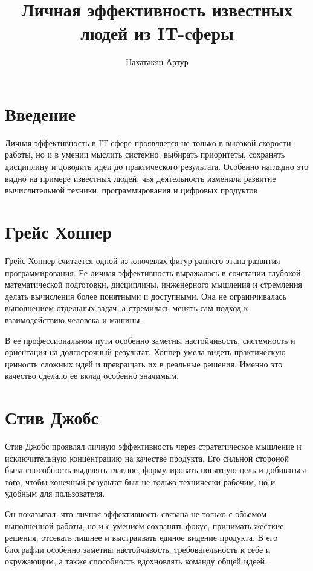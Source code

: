 \documentclass[12pt,a4paper]{article}
\title{Личная эффективность известных людей из IT-сферы}
\author{Нахатакян Артур}
\date{}
\begin{document}
\maketitle

\section*{Введение}

Личная эффективность в IT-сфере проявляется не только в высокой скорости работы, но и в умении мыслить системно, выбирать приоритеты, сохранять дисциплину и доводить идеи до практического результата. Особенно наглядно это видно на примере известных людей, чья деятельность изменила развитие вычислительной техники, программирования и цифровых продуктов.

\section*{Грейс Хоппер}

Грейс Хоппер считается одной из ключевых фигур раннего этапа развития программирования. Ее личная эффективность выражалась в сочетании глубокой математической подготовки, дисциплины, инженерного мышления и стремления делать вычисления более понятными и доступными. Она не ограничивалась выполнением отдельных задач, а стремилась менять сам подход к взаимодействию человека и машины.

В ее профессиональном пути особенно заметны настойчивость, системность и ориентация на долгосрочный результат. Хоппер умела видеть практическую ценность сложных идей и превращать их в реальные решения. Именно это качество сделало ее вклад особенно значимым.

\section*{Стив Джобс}

Стив Джобс проявлял личную эффективность через стратегическое мышление и исключительную концентрацию на качестве продукта. Его сильной стороной была способность выделять главное, формулировать понятную цель и добиваться того, чтобы конечный результат был не только технически рабочим, но и удобным для пользователя.

Он показывал, что личная эффективность связана не только с объемом выполненной работы, но и с умением сохранять фокус, принимать жесткие решения, отсекать лишнее и выстраивать единое видение продукта. В его биографии особенно заметны настойчивость, требовательность к себе и окружающим, а также способность вдохновлять команду общей идеей.
\end{document}
